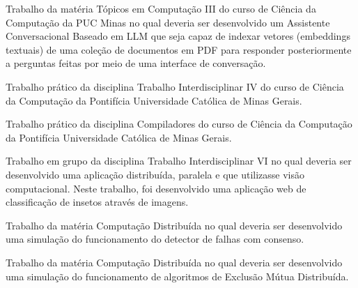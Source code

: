 
Trabalho da matéria Tópicos em Computação III do curso de Ciência da Computação da PUC Minas no qual deveria ser desenvolvido um Assistente Conversacional Baseado em LLM que seja capaz de indexar vetores (embeddings textuais) de uma coleção de documentos em PDF para responder posteriormente a perguntas feitas por meio de uma interface de conversação.
\divider

Trabalho prático da disciplina Trabalho Interdisciplinar IV do curso de Ciência da Computação da Pontifícia Universidade Católica de Minas Gerais.
\divider

Trabalho prático da disciplina Compiladores do curso de Ciência da Computação da Pontifícia Universidade Católica de Minas Gerais.\\
\divider

Trabalho em grupo da disciplina Trabalho Interdisciplinar VI no qual deveria ser desenvolvido uma aplicação distribuída, paralela e que utilizasse visão computacional. Neste trabalho, foi desenvolvido uma aplicação web de classificação de insetos através de imagens.\\
\divider

Trabalho da matéria Computação Distribuída no qual deveria ser desenvolvido uma simulação do funcionamento do detector de falhas com consenso.\\
\divider

Trabalho da matéria Computação Distribuída no qual deveria ser desenvolvido uma simulação do funcionamento de algoritmos de Exclusão Mútua Distribuída.\\
\divider

